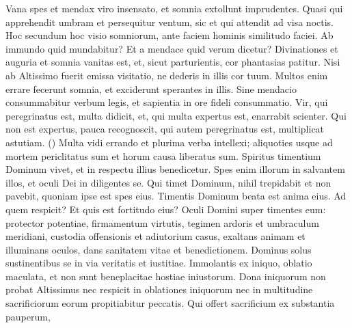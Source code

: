 \begin{biblechapter}
\begin{biblechapter}
\begin{biblechapter}
\begin{biblechapter}
\begin{biblechapter}
\begin{biblechapter}
\begin{biblechapter}
\begin{biblechapter}
\begin{biblechapter}
\begin{biblechapter}
\begin{biblechapter}
\begin{biblechapter}
\begin{biblechapter}
\begin{biblechapter}
\begin{biblechapter}
\begin{biblechapter}
\begin{biblechapter}
\begin{biblechapter}
\begin{biblechapter}
\begin{biblechapter}
\begin{biblechapter}
\begin{biblechapter}
\begin{biblechapter}
\begin{biblechapter}
\begin{biblechapter}
\begin{biblechapter}
\begin{biblechapter}
\begin{biblechapter}
\begin{biblechapter}
\begin{biblechapter}
\begin{biblechapter}
\begin{biblechapter}
\begin{biblechapter}
\begin{biblechapter}
\verse Vana spes et mendax viro insensato,
 et somnia extollunt imprudentes.
 \verse Quasi qui apprehendit umbram et persequitur ventum,
 sic et qui attendit ad visa noctis.
 \verse Hoc secundum hoc visio somniorum,
 ante faciem hominis similitudo faciei.
 \verse Ab immundo quid mundabitur?
 Et a mendace quid verum dicetur?
 \verse Divinationes et auguria et somnia vanitas est,
 \verse et, sicut parturientis, cor phantasias patitur.
 Nisi ab Altissimo fuerit emissa visitatio,
 ne dederis in illis cor tuum.
 \verse Multos enim errare fecerunt somnia,
 et exciderunt sperantes in illis.
 \verse Sine mendacio consummabitur verbum legis,
 et sapientia in ore fideli consummatio.
 \verse Vir, qui peregrinatus est, multa didicit,
 et, qui multa expertus est, enarrabit scienter.
 \verse Qui non est expertus, pauca recognoscit,
 qui autem peregrinatus est, multiplicat astutiam. (\verse)
 \verse Multa vidi errando
 et plurima verba intellexi;
 \verse aliquoties usque ad mortem periclitatus sum
 et horum causa liberatus sum.
 \verse Spiritus timentium Dominum vivet,
 et in respectu illius benedicetur.
 \verse Spes enim illorum in salvantem illos,
 et oculi Dei in diligentes se.
 \verse Qui timet Dominum, nihil trepidabit
 et non pavebit, quoniam ipse est spes eius.
 \verse Timentis Dominum beata est anima eius.
 \verse Ad quem respicit? Et quis est fortitudo eius?
 \verse Oculi Domini super timentes eum:
 protector potentiae, firmamentum virtutis,
 tegimen ardoris et umbraculum meridiani,
 \verse custodia offensionis et adiutorium casus,
 exaltans animam et illuminans oculos,
 dans sanitatem vitae et benedictionem.
 \verse Dominus solus sustinentibus se
 in via veritatis et iustitiae.
 \verse Immolantis ex iniquo, oblatio maculata,
 et non sunt beneplacitae hostiae iniustorum.
 \verse Dona iniquorum non probat Altissimus
 nec respicit in oblationes iniquorum
 nec in multitudine sacrificiorum eorum propitiabitur peccatis.
 \verse Qui offert sacrificium ex substantia pauperum,

\end{biblechapter}
\end{biblechapter}
\end{biblechapter}
\end{biblechapter}
\end{biblechapter}
\end{biblechapter}
\end{biblechapter}
\end{biblechapter}
\end{biblechapter}
\end{biblechapter}
\end{biblechapter}
\end{biblechapter}
\end{biblechapter}
\end{biblechapter}
\end{biblechapter}
\end{biblechapter}
\end{biblechapter}
\end{biblechapter}
\end{biblechapter}
\end{biblechapter}
\end{biblechapter}
\end{biblechapter}
\end{biblechapter}
\end{biblechapter}
\end{biblechapter}
\end{biblechapter}
\end{biblechapter}
\end{biblechapter}
\end{biblechapter}
\end{biblechapter}
\end{biblechapter}
\end{biblechapter}
\end{biblechapter}
\end{biblechapter}
